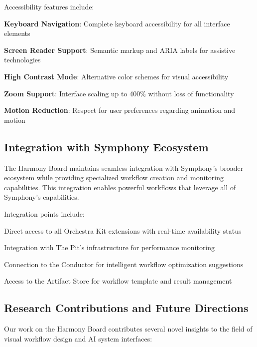 Accessibility features include:

\begin{expandedlist}
    \item \textbf{Keyboard Navigation}: Complete keyboard accessibility for all interface elements
    \item \textbf{Screen Reader Support}: Semantic markup and ARIA labels for assistive technologies
    \item \textbf{High Contrast Mode}: Alternative color schemes for visual accessibility
    \item \textbf{Zoom Support}: Interface scaling up to 400\% without loss of functionality
    \item \textbf{Motion Reduction}: Respect for user preferences regarding animation and motion
\end{expandedlist}

\subsection*{Integration with Symphony Ecosystem}

The Harmony Board maintains seamless integration with Symphony's broader ecosystem while providing specialized workflow creation and monitoring capabilities. This integration enables powerful workflows that leverage all of Symphony's capabilities.

Integration points include:

\begin{compactlist}
    \item Direct access to all Orchestra Kit extensions with real-time availability status
    \item Integration with The Pit's infrastructure for performance monitoring
    \item Connection to the Conductor for intelligent workflow optimization suggestions
    \item Access to the Artifact Store for workflow template and result management
\end{compactlist}

\subsection*{Research Contributions and Future Directions}

Our work on the Harmony Board contributes several novel insights to the field of visual workflow design and AI system interfaces:

